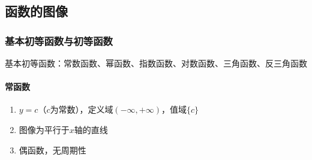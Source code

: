 \documentclass[../book.tex]{subfiles}
\begin{document}
    \subsection{函数的图像}

    \subsubsection{基本初等函数与初等函数}

    基本初等函数：常数函数、幂函数、指数函数、对数函数、三角函数、反三角函数

    \paragraph{常函数}
    \begin{enumerate}
        \item $y = c$（$c$为常数），定义域$(-\infty, +\infty)$，值域$\{c\}$
        \item 图像为平行于$x$轴的直线
        \item 偶函数，无周期性
    \end{enumerate}
\end{document}
